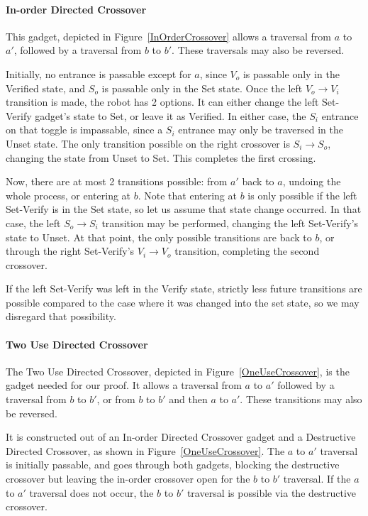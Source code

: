 \paragraph{In-order Directed Crossover} This gadget, depicted in Figure~\ref{InOrderCrossover} allows a traversal from $a$ to $a'$, followed by a traversal from $b$ to $b'$. These traversals may also be reversed.

Initially, no entrance is passable except for $a$, since $V_o$ is passable only in the Verified state, and $S_o$ is
passable only in the Set state. Once the left $V_o \rightarrow V_i$ transition is made, the robot has 2 options.
It can either change the left Set-Verify gadget's state to Set, or leave it as Verified. In either case, the $S_i$
entrance on that toggle is impassable, since a $S_i$ entrance may only be traversed in the Unset state. The
only transition possible on the right crossover is $S_i \rightarrow S_o$, changing the state from Unset to Set.
This completes the first crossing.

Now, there are at most 2 transitions possible: from $a'$ back to $a$, undoing the whole process, or entering at $b$. Note that entering at $b$ is only possible if the left Set-Verify is in the Set state, so let us assume that state change occurred. In that case, the left $S_o \rightarrow S_i$ transition may be performed, changing the left Set-Verify's state to Unset. At that point, the only possible transitions are back to $b$, or through the right Set-Verify's
$V_i \rightarrow V_o$ transition, completing the second crossover.

If the left Set-Verify was left in the Verify state, strictly less future transitions are possible compared to the case where it was changed into the set state, so we may disregard that possibility.


\paragraph{Two Use Directed Crossover} 
The Two Use Directed Crossover, depicted in Figure~\ref{OneUseCrossover}, is the gadget needed for our proof. It allows a traversal from $a$ to $a'$ followed by a traversal from $b$ to $b'$, or from $b$ to $b'$ and then $a$ to $a'$. These transitions may also be reversed.

It is constructed out of an In-order Directed Crossover gadget and a Destructive Directed Crossover, as shown in Figure~\ref{OneUseCrossover}. The $a$ to $a'$ traversal is initially passable, and goes through both gadgets,
blocking the destructive crossover but leaving the in-order crossover open for the $b$ to $b'$ traversal. If the $a$ to $a'$ traversal does not occur, the $b$ to $b'$ traversal is possible via the destructive crossover.

